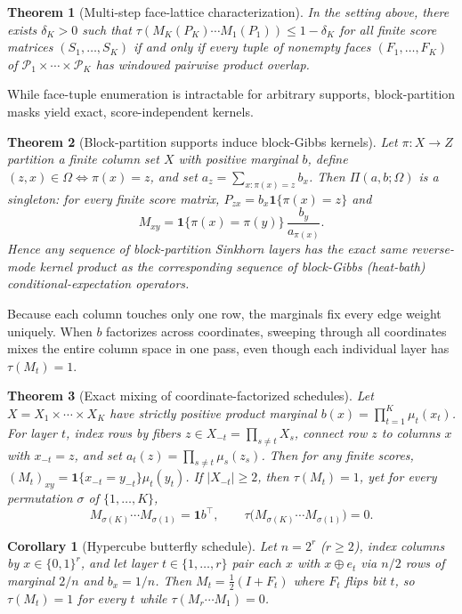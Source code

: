 \documentclass[10pt]{article}
\newtheorem{theorem}{Theorem}
\newtheorem{corollary}{Corollary}
\newcommand{\one}{\mathbf{1}}
\begin{document}
\begin{theorem}[Multi-step face-lattice characterization]
\label{thm:multistep-face-lattice}
In the setting above, there exists $\delta_K > 0$ such that $\tau(M_K(P_K)\cdots M_1(P_1)) \le 1 - \delta_K$ for all finite score matrices $(S_1,\dots,S_K)$ if and only if every tuple of nonempty faces $(F_1,\dots,F_K)$ of $\mathcal{P}_1 \times \cdots \times \mathcal{P}_K$ has windowed pairwise product overlap.
\end{theorem}

While face-tuple enumeration is intractable for arbitrary supports, block-partition masks yield exact, score-independent kernels.

\begin{theorem}[Block-partition supports induce block-Gibbs kernels]
\label{thm:block-partition}
Let $\pi : X \to Z$ partition a finite column set $X$ with positive marginal $b$, define $(z,x)\in\Omega \iff \pi(x)=z$, and set $a_z = \sum_{x:\pi(x)=z} b_x$. Then $\Pi(a,b;\Omega)$ is a singleton: for every finite score matrix, $P_{zx} = b_x\one\{\pi(x)=z\}$ and
\[
  M_{xy} = \one\{\pi(x)=\pi(y)\}\,\frac{b_y}{a_{\pi(x)}}.
\]
Hence any sequence of block-partition Sinkhorn layers has the exact same reverse-mode kernel product as the corresponding sequence of block-Gibbs (heat-bath) conditional-expectation operators.
\end{theorem}

Because each column touches only one row, the marginals fix every edge weight uniquely. When $b$ factorizes across coordinates, sweeping through all coordinates mixes the entire column space in one pass, even though each individual layer has $\tau(M_t) = 1$.

\begin{theorem}[Exact mixing of coordinate-factorized schedules]
\label{thm:coordinate-schedule}
Let $X = X_1 \times \cdots \times X_K$ have strictly positive product marginal $b(x) = \prod_{t=1}^K \mu_t(x_t)$. For layer $t$, index rows by fibers $z \in X_{-t} = \prod_{s\neq t} X_s$, connect row $z$ to columns $x$ with $x_{-t} = z$, and set $a_t(z) = \prod_{s\neq t} \mu_s(z_s)$. Then for any finite scores, $(M_t)_{xy} = \one\{x_{-t}=y_{-t}\}\mu_t(y_t)$. If $|X_{-t}| \ge 2$, then $\tau(M_t) = 1$, yet for every permutation $\sigma$ of $\{1,\dots,K\}$,
\[
  M_{\sigma(K)} \cdots M_{\sigma(1)} = \one b^\top,
  \qquad
  \tau\bigl(M_{\sigma(K)} \cdots M_{\sigma(1)}\bigr) = 0.
\]
\end{theorem}

\begin{corollary}[Hypercube butterfly schedule]
\label{cor:butterfly-schedule}
Let $n = 2^r$ ($r \ge 2$), index columns by $x \in \{0,1\}^r$, and let layer $t \in \{1,\dots,r\}$ pair each $x$ with $x \oplus e_t$ via $n/2$ rows of marginal $2/n$ and $b_x = 1/n$. Then $M_t = \frac{1}{2}(I + F_t)$ where $F_t$ flips bit $t$, so $\tau(M_t) = 1$ for every $t$ while $\tau(M_r \cdots M_1) = 0$.
\end{corollary}
\end{document}
